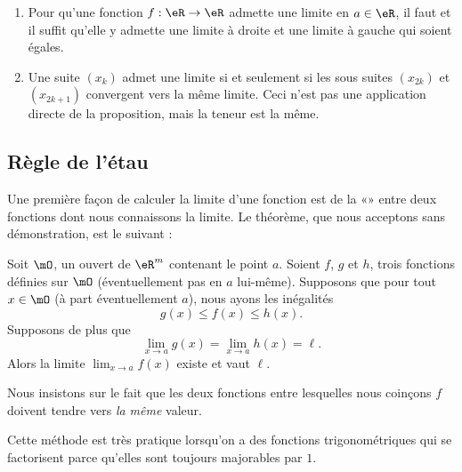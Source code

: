 \begin{example}
  \begin{enumerate}
  \item Pour qu'une fonction $f : \eR \to \eR$ admette une limite en
    $a \in \eR$, il faut et il suffit qu'elle y admette une limite à
    droite et une limite à gauche qui soient égales.

  \item Une suite $(x_k)$ admet une limite si et seulement si les
    sous suites $(x_{2k})$ et $(x_{2k+1})$ convergent vers la même
    limite. Ceci n'est pas une application directe de la proposition,
    mais la teneur est la même.
  \end{enumerate}
\end{example}

\subsection{Règle de l'étau}

Une première façon de calculer la limite d'une fonction est de la «» entre deux fonctions dont nous connaissons la limite. Le théorème, que nous acceptons sans démonstration, est le suivant :
\begin{theorem}		\label{ThoRegleEtau}
	Soit $\mO$, un ouvert de $\eR^m$ contenant le point $a$. Soient $f$, $g$ et $h$, trois fonctions définies sur $\mO$ (éventuellement pas en $a$ lui-même). Supposons que pour tout $x\in\mO$ (à part éventuellement $a$), nous ayons les inégalités
	\begin{equation}
		g(x)\leq f(x)\leq h(x).
	\end{equation}
	Supposons de plus que
	\begin{equation}
		\lim_{x\to a} g(x)=\lim_{x\to a} h(x)=\ell.
	\end{equation}
	Alors la limite $\lim_{x\to a} f(x)$ existe et vaut $\ell$.
\end{theorem}

Nous insistons sur le fait que les deux fonctions entre lesquelles nous coinçons $f$ doivent tendre vers \emph{la même} valeur.

Cette méthode est très pratique lorsqu'on a des fonctions trigonométriques qui se factorisent parce qu'elles sont toujours majorables par $1$.

